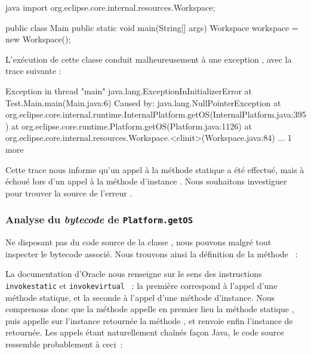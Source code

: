\begin{imtaCode}{java}
import org.eclipse.core.internal.resources.Workspace;    

public class Main {
    public static void main(String[] args) {
        Workspace workspace = new Workspace();
    }
}
\end{imtaCode}

L'exécution de cette classe conduit malheureusement à une exception , avec la trace suivante :

\begin{imtaConsole}
Exception in thread "main" java.lang.ExceptionInInitializerError
	at Test.Main.main(Main.java:6)
Caused by: java.lang.NullPointerException
	at org.eclipse.core.internal.runtime.InternalPlatform.getOS(InternalPlatform.java:395)
	at org.eclipse.core.runtime.Platform.getOS(Platform.java:1126)
	at org.eclipse.core.internal.resources.Workspace.<clinit>(Workspace.java:84)
	... 1 more
\end{imtaConsole}

Cette trace nous informe qu'un appel à la méthode statique  a été effectué, mais à échoué lors d'un appel à la méthode d'instance %
.
Nous souhaitons investiguer pour trouver la source de l'erreur .


\subsubsection{Analyse du \textit{bytecode} de \texttt{Platform.getOS}}

Ne disposant pas du code source de la classe , nous pouvons malgré tout inspecter le bytecode associé.
Nous trouvons ainsi la définition de la méthode ~:


La documentation d'Oracle nous renseigne sur le sens des instructions \texttt{invokestatic} \cite{javainvokestatic} et \texttt{invokevirtual} \cite{javainvokevirtual}~: %
la première correspond à l'appel d'une méthode statique, et la seconde à l'appel d'une méthode d'instance.
Nous comprenons donc que la méthode  appelle en premier lieu la méthode statique , %
puis appelle sur l'instance retournée la méthode , et renvoie enfin l'instance de  retournée.
Les appels étant naturellement chaînés façon Java, le code source ressemble probablement à ceci~:

